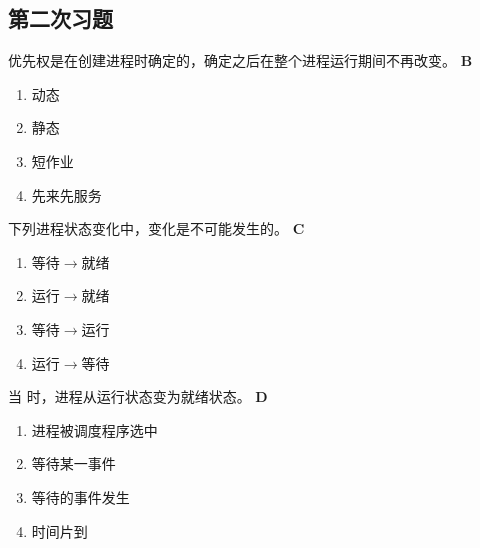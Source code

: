 \subsection*{第二次习题}
\setcounter{problemname}{0}

\begin{problem}
	\myline 优先权是在创建进程时确定的，确定之后在整个进程运行期间不再改变。
	\textbf{B}
	\vspace{-0.5em}
	\begin{multicols}{4}
		\begin{enumerate}[label=\Alph*.]
			\item 动态
			\item 静态
			\item 短作业
			\item 先来先服务
		\end{enumerate}
	\end{multicols}
	\vspace{-1em}
\end{problem}


\begin{problem}
	下列进程状态变化中，\myline 变化是不可能发生的。
	\textbf{C}
	\vspace{-0.5em}
	\begin{multicols}{4}
		\begin{enumerate}[label=\Alph*.]
			\item 等待$\rightarrow$就绪
			\item 运行$\rightarrow$就绪
			\item 等待$\rightarrow$运行
			\item 运行$\rightarrow$等待
		\end{enumerate}
	\end{multicols}
	\vspace{-1em}
\end{problem}


\begin{problem}
	​当 \myline 时，进程从运行状态变为就绪状态。
	\textbf{D}
	\vspace{-0.5em}
	\begin{multicols}{2}
		\begin{enumerate}[label=\Alph*.]
			\item 进程被调度程序选中
			\item 等待某一事件
			\item 等待的事件发生
			\item 时间片到
		\end{enumerate}
	\end{multicols}
	\vspace{-1em}
\end{problem}


